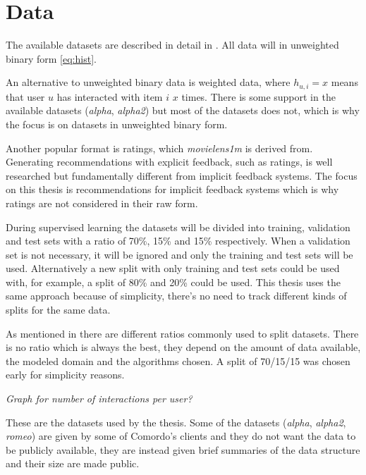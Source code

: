 
\section{Data}\label{sec:datasets}


The available datasets are described in detail in . All data will in unweighted binary form \eqref{eq:hist}.

An alternative to unweighted binary data is weighted data, where $h_{u, i} = x$ means that user $u$ has interacted with item $i$ $x$ times. There is some support in the available datasets (\textit{alpha}, \textit{alpha2}) but most of the datasets does not, which is why the focus is on datasets in unweighted binary form.

Another popular format is ratings, which \textit{movielens1m} is derived from. Generating recommendations with explicit feedback, such as ratings, is well researched but fundamentally different from implicit feedback systems. The focus on this thesis is recommendations for implicit feedback systems which is why ratings are not considered in their raw form.

During supervised learning the datasets will be divided into training, validation and test sets with a ratio of 70\%, 15\% and 15\% respectively. When a validation set is not necessary, it will be ignored and only the training and test sets will be used. Alternatively a new split with only training and test sets could be used with, for example, a split of 80\% and 20\% could be used. This thesis uses the same approach because of simplicity, there's no need to track different kinds of splits for the same data.

As mentioned in  there are different ratios commonly used to split datasets. There is no ratio which is always the best, they depend on the amount of data available, the modeled domain and the algorithms chosen. A split of 70/15/15 was chosen early for simplicity reasons.


\textit{Graph for number of interactions per user?}

These are the datasets used by the thesis. Some of the datasets (\textit{alpha}, \textit{alpha2}, \textit{romeo}) are given by some of Comordo's clients and they do not want the data to be publicly available, they are instead given brief summaries of the data structure and their size are made public.


